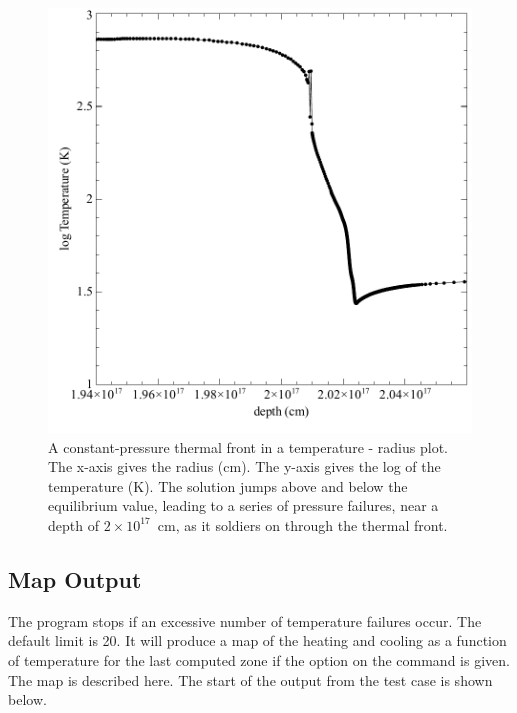 \begin{figure}
\centering
\includegraphics[scale=0.5]{temperature_depth}
\caption[Constant pressure thermal front]{\label{fig:temperature_depth}A constant-pressure thermal front
in a temperature - radius plot.
The x-axis gives the radius (cm).  The y-axis gives the log of the
temperature (K).
The solution jumps above and below the equilibrium value,
leading to a series of pressure failures, near a depth of
$2\times 10^{17}$~cm, as
it soldiers on through the thermal front.}
\end{figure}

\subsection{Map Output}

The program stops if an excessive number of temperature failures occur.
The default limit is 20.
It will produce a map of the heating and cooling
as a function of temperature for the last computed zone if the  option
on the  command is given.
The map is described here.
The start
of the output from the test case  is shown below.

